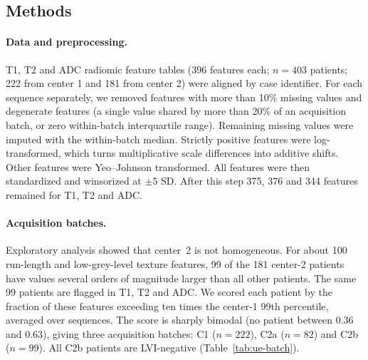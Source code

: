 \subsection{Methods}
\label{sec:ue-methods}

\paragraph{Data and preprocessing.}
T1, T2 and ADC radiomic feature tables (396 features each; $n=403$ patients;
222 from center 1 and 181 from center 2) were aligned by case identifier. For
each sequence separately, we removed features with more than 10\% missing
values and degenerate features (a single value shared by more than 20\% of
an acquisition batch, or zero within-batch interquartile range). Remaining
missing values were imputed with the within-batch median. Strictly positive
features were log-transformed, which turns multiplicative scale differences
into additive shifts. Other features were Yeo--Johnson transformed. All
features were then standardized and winsorized at $\pm5$ SD. After this step
375, 376 and 344 features remained for T1, T2 and ADC.

\paragraph{Acquisition batches.}
Exploratory analysis showed that center~2 is not homogeneous. For about 100
run-length and low-grey-level texture features, 99 of the 181 center-2
patients have values several orders of magnitude larger than all other
patients. The same 99 patients are flagged in T1, T2 and ADC. We scored each
patient by the fraction of these features exceeding ten times the center-1
99th percentile, averaged over sequences. The score is sharply bimodal
(no patient between 0.36 and 0.63), giving three acquisition batches: C1
($n=222$), C2a ($n=82$) and C2b ($n=99$). All C2b patients are LVI-negative
(Table~\ref{tab:ue-batch}).

